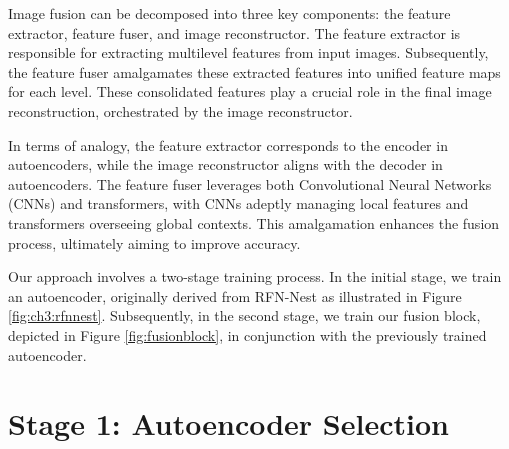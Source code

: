 \label{chp:b3}

Image fusion can be decomposed into three key components: the feature extractor, feature fuser, and image reconstructor. The feature extractor is responsible for extracting multilevel features from input images. Subsequently, the feature fuser amalgamates these extracted features into unified feature maps for each level. These consolidated features play a crucial role in the final image reconstruction, orchestrated by the image reconstructor.

In terms of analogy, the feature extractor corresponds to the encoder in autoencoders, while the image reconstructor aligns with the decoder in autoencoders. The feature fuser leverages both Convolutional Neural Networks (CNNs) and transformers, with CNNs adeptly managing local features and transformers overseeing global contexts. This amalgamation enhances the fusion process, ultimately aiming to improve accuracy.

Our approach involves a two-stage training process. In the initial stage, we train an autoencoder, originally derived from RFN-Nest \cite{li2021rfn} as illustrated in Figure \ref{fig:ch3:rfnnest}. Subsequently, in the second stage, we train our fusion block, depicted in Figure \ref{fig:fusionblock}, in conjunction with the previously trained autoencoder.

\section{Stage 1: Autoencoder Selection} \label{subsec:aesel}


